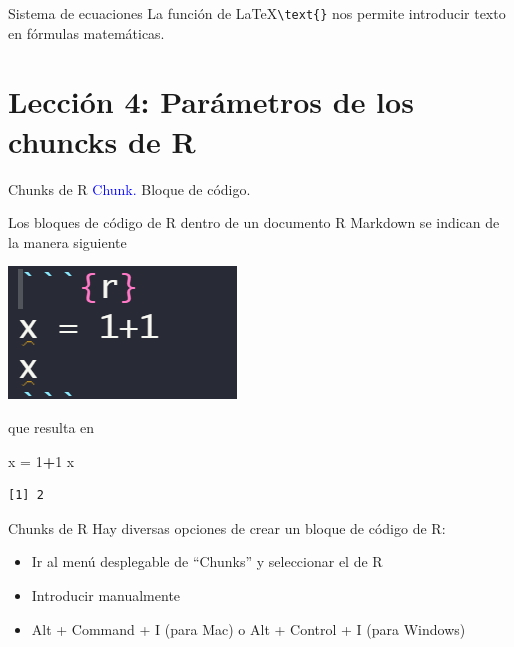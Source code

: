 \documentclass[
  ignorenonframetext,
  aspectratio=169]{beamer}
\newenvironment{Shaded}{\begin{snugshade}}{\end{snugshade}}
\newcommand{\DecValTok}[1]{\textcolor[rgb]{0.00,0.00,0.81}{#1}}
\newcommand{\NormalTok}[1]{#1}
\newcommand{\OtherTok}[1]{\textcolor[rgb]{0.56,0.35,0.01}{#1}}
\newcommand{\SpecialCharTok}[1]{\textcolor[rgb]{0.81,0.36,0.00}{\textbf{#1}}}
\providecommand{\tightlist}{%
  \setlength{\itemsep}{0pt}\setlength{\parskip}{0pt}}
\newcommand\blue[1]{\textcolor{blue}{#1}}
\begin{document}
\begin{frame}[fragile]{Sistema de ecuaciones}
\label{sistema-de-ecuaciones-2}
La función de \LaTeX \texttt{\textbackslash{}text\{\}} nos permite
introducir texto en fórmulas matemáticas.
\end{frame}

\section{Lección 4: Parámetros de los chuncks de
R}\label{lecciuxf3n-4-paruxe1metros-de-los-chuncks-de-r}

\begin{frame}[fragile]{Chunks de R}
\label{chunks-de-r}
\blue{Chunk.} Bloque de código.

Los bloques de código de R dentro de un documento R Markdown se indican
de la manera siguiente

\begin{center}\includegraphics[width=0.15\linewidth]{Imgs/chunk_00} \end{center}

que resulta en

\begin{Shaded}
\begin{Highlighting}[]
\NormalTok{x }\OtherTok{=} \DecValTok{1}\SpecialCharTok{+}\DecValTok{1}
\NormalTok{x}
\end{Highlighting}
\end{Shaded}

\begin{verbatim}
[1] 2
\end{verbatim}
\end{frame}

\begin{frame}{Chunks de R}
\label{chunks-de-r-1}
Hay diversas opciones de crear un bloque de código de R:

\begin{itemize}
\tightlist
\item
  Ir al menú desplegable de ``Chunks'' y seleccionar el de R
\item
  Introducir manualmente
\item
  Alt + Command + I (para Mac) o Alt + Control + I (para Windows)
\end{itemize}
\end{frame}
\end{document}
